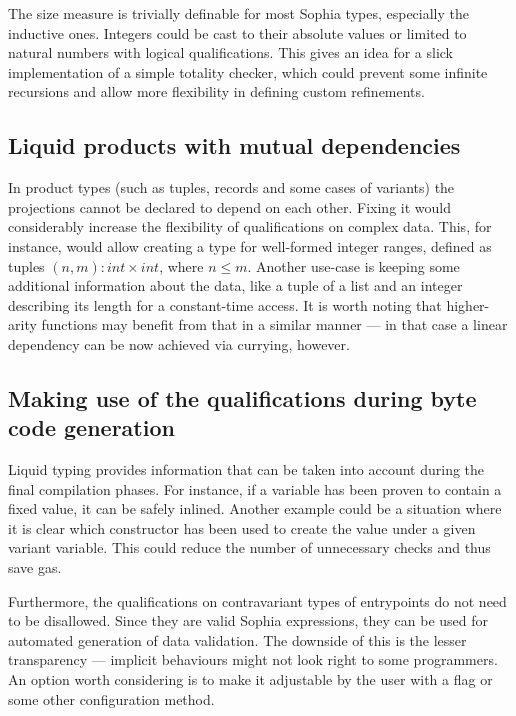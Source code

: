 The size measure is trivially definable for most Sophia types, especially the
inductive ones. Integers could be cast to their absolute values or limited to
natural numbers with logical qualifications. This gives an idea for a slick
implementation of a simple totality checker, which could prevent some infinite
recursions and allow more flexibility in defining custom refinements.

\subsection{Liquid products with mutual dependencies}
\label{dependent_products}

In product types (such as tuples, records and some cases of variants) the
projections cannot be declared to depend on each other. Fixing it would
considerably increase the flexibility of qualifications on complex data. This,
for instance, would allow creating a type for well-formed integer ranges,
defined as tuples $(n, m) : int \times int$, where $n \leq m$. Another use-case
is keeping some additional information about the data, like a tuple of a list
and an integer describing its length for a constant-time access. It is worth
noting that higher-arity functions may benefit from that in a similar manner ---
in that case a linear dependency can be now achieved via currying, however.

\subsection{Making use of the qualifications during byte code generation}
\label{making_use_of_quals}

Liquid typing provides information that can be taken into account during the
final compilation phases. For instance, if a variable has been proven to contain
a fixed value, it can be safely inlined. Another example could be a situation
where it is clear which constructor has been used to create the value under a
given variant variable. This could reduce the number of unnecessary checks and
thus save gas.

Furthermore, the qualifications on contravariant types of entrypoints do not
need to be disallowed. Since they are valid Sophia expressions, they can be used
for automated generation of data validation. The downside of this is the lesser
transparency --- implicit behaviours might not look right to some programmers.
An option worth considering is to make it adjustable by the user with a flag or
some other configuration method.

